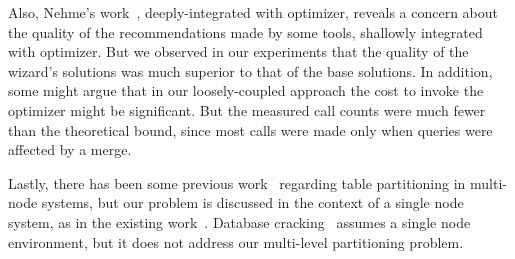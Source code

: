 \documentclass[runningheads]{comsis2}
\begin{document}
Also, Nehme's work~\cite{nehme2011automated}, deeply-integrated with 
optimizer, reveals a concern about the quality of the recommendations 
made by some tools, shallowly integrated with optimizer. 
But we observed in our experiments that the quality of 
the wizard's solutions was much superior to that of the base solutions. 
In addition, some might argue that in our loosely-coupled approach 
the cost to invoke the optimizer might be significant. 
But the measured call counts were much fewer than 
the theoretical bound, since most calls were made only when queries were affected by a merge.  


Lastly, there has been some previous work~\cite{nehme2011automated,rao2002automating,tatarowicz2012lookup} 
regarding table partitioning in multi-node \hbox{systems}, but 
our problem is discussed in the context of a single node system, as in the existing work~\cite{agrawal04:integrating}. 
Database cracking~\cite{idreoskm07}
assumes a single node environment, but 
it does not address our multi-level partitioning problem. 
\end{document}

